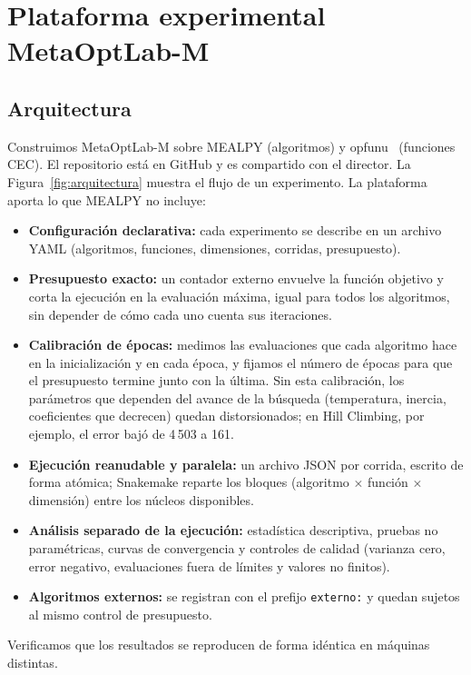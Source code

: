 \documentclass[11pt,letterpaper]{article}
\begin{document}
\section{Plataforma experimental MetaOptLab-M}

\subsection{Arquitectura}

Construimos MetaOptLab-M sobre MEALPY (algoritmos) y opfunu~\cite{opfunu} (funciones CEC). El repositorio está en GitHub y es compartido con el director. La Figura~\ref{fig:arquitectura} muestra el flujo de un experimento. La plataforma aporta lo que MEALPY no incluye:
\begin{itemize}
  \item \textbf{Configuración declarativa:} cada experimento se describe en un archivo YAML (algoritmos, funciones, dimensiones, corridas, presupuesto).
  \item \textbf{Presupuesto exacto:} un contador externo envuelve la función objetivo y corta la ejecución en la evaluación máxima, igual para todos los algoritmos, sin depender de cómo cada uno cuenta sus iteraciones.
  \item \textbf{Calibración de épocas:} medimos las evaluaciones que cada algoritmo hace en la inicialización y en cada época, y fijamos el número de épocas para que el presupuesto termine junto con la última. Sin esta calibración, los parámetros que dependen del avance de la búsqueda (temperatura, inercia, coeficientes que decrecen) quedan distorsionados; en Hill Climbing, por ejemplo, el error bajó de 4\,503 a 161.
  \item \textbf{Ejecución reanudable y paralela:} un archivo JSON por corrida, escrito de forma atómica; Snakemake reparte los bloques (algoritmo $\times$ función $\times$ dimensión) entre los núcleos disponibles.
  \item \textbf{Análisis separado de la ejecución:} estadística descriptiva, pruebas no paramétricas, curvas de convergencia y controles de calidad (varianza cero, error negativo, evaluaciones fuera de límites y valores no finitos).
  \item \textbf{Algoritmos externos:} se registran con el prefijo \texttt{externo:} y quedan sujetos al mismo control de presupuesto.
\end{itemize}
Verificamos que los resultados se reproducen de forma idéntica en máquinas distintas.
\end{document}
